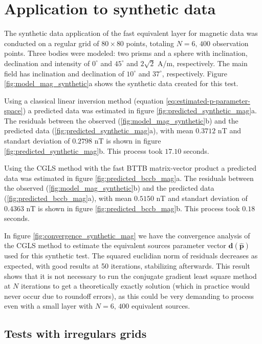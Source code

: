 \section{Application to synthetic data}

The synthetic data application of the fast equivalent layer for magnetic data was conducted on a regular grid of  $80 \times 80$ points, totaling $N = 6,\, 400$ observation points. Three bodies were modeled: two prisms and a sphere with inclination, declination and intensity of $0^{\circ}$ and $45^{\circ}$ and $2\sqrt{2}$ A/m, respectively. The main field has inclination and declination of $10^{\circ}$ and $37^{\circ}$, respectively. Figure \ref{fig:model_mag_synthetic}a shows the synthetic data created for this test.

Using a classical linear inversion method (equation \ref{eq:estimated-p-parameter-space}) a predicted data was estimated in figure \ref{fig:predicted_synthetic_mag}a. The residuals between the observed (\ref{fig:model_mag_synthetic}b) and the predicted data (\ref{fig:predicted_synthetic_mag}a), with mean $0.3712$ nT and standart deviation of $0.2798$ nT is shown in figure \ref{fig:predicted_synthetic_mag}b. This process took $17.10$ seconds.

Using the CGLS method with the fast BTTB matrix-vector product a predicted data was estimated in figure \ref{fig:predicted_bccb_mag}a. The residuals between the observed (\ref{fig:model_mag_synthetic}b) and the predicted data (\ref{fig:predicted_bccb_mag}a), with mean $0.5150$ nT and standart deviation of $0.4363$ nT is shown in figure \ref{fig:predicted_bccb_mag}b. This process took $0.18$ seconds.

In figure \ref{fig:convergence_synthetic_mag} we have the convergence analysis of the CGLS method to estimate the equivalent sources parameter vector $\mathbf{d}(\hat{\mathbf{p}})$ used for this synthetic test. The squared euclidian norm of residuals decreases as expected, with good results at 50 iterations, stabilizing afterwards. This result shows that it is not necessary to run the conjugate gradient least square method at $N$ iterations to get a theoretically exactly solution (which in practice would never occur due to roundoff errors), as this could be very demanding to process even with a small layer with $N = 6,\, 400$ equivalent sources. 

\subsection*{Tests with irregulars grids}

